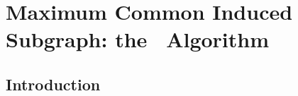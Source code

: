 \chapter{Maximum Common Induced Subgraph: the \McSplit\ Algorithm}
\label{c:mcsplit-i-undirected}

\newcommand{\BigO}[1]{\ensuremath{\operatorname{O}\left(#1\right)}}

\newcommand{\exampleG} {
    \tikz {
        \graph [nodes={draw, circle, minimum width=.55cm, inner sep=1pt}, circular placement, radius=0.95cm,
                clockwise=5] {
                    1,2,3,4,5;
            1--4; 1--5; 2--3; 2--5; 3--5;
        };
    }
}
\newcommand{\exampleH} {
    \tikz {
        \graph [nodes={draw, circle, minimum width=.55cm, inner sep=1pt}, circular placement, radius=0.95cm,
                clockwise=6, phase=60] {
                    a,b,c,d,e,f;
            a--b; a--c; a--e; b--d; b--f; c--d; c--e; c--f; d--f; e--f;
        };
    }
}

\newcommand{\LabelTables}[3] {
  {\small
    \centering
    \begin{minipage}[t]{.20\linewidth}
        Mapping

        \medskip

        #1
    \end{minipage}
    \quad
    \begin{minipage}[t]{0.31\linewidth}
        \centering
        Labelling of $\graphG$

        \begin{tabular}[t]{cc}
        \toprule
            Vertex & Label\\
        \midrule
            #2
        \bottomrule
        \end{tabular}
    \end{minipage}
    \quad
    \begin{minipage}[t]{0.31\linewidth}
        \centering
        Labelling of $\graphH$

        \begin{tabular}[t]{cc}
        \toprule
            Vertex & Label\\
        \midrule
            #3
        \bottomrule
        \end{tabular}
        \medskip
    \end{minipage}
  }
}


\section{Introduction}

